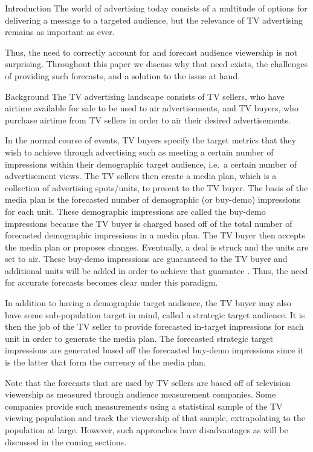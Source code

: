 \begin{chapter}{Introduction}\label{introduction}
  The world of advertising today consists of a multitude of options
  for delivering a message to a targeted audience, but the relevance of TV advertising
  remains as important as ever.

  Thus, the need to correctly account for and forecast audience viewership is not surprising.
  Throughout this paper we discuss why that need exists, the challenges of providing such forecasts,
  and a solution to the issue at hand.

\begin{section}{Background}
  The TV advertising landscape consists of TV sellers, who have airtime available
  for sale to be used to air advertisements, and TV buyers, who purchase airtime
  from TV sellers in order to air their desired advertisements.

  In the normal course of events, TV buyers specify the target metrics that
  they wish to achieve through advertising such as meeting a certain number of impressions within their demographic target audience,
  i.e.\ a certain number of advertisement views.
  The TV sellers then create a media plan, which is a collection of advertising spots/units, to present to the TV buyer.
  The basis of the media plan is the forecasted number of demographic (or buy-demo) impressions for each unit.
  These demographic impressions are called the buy-demo impressions because the TV buyer is charged
  based off of the total number of forecasted demographic impressions in a media plan.
  The TV buyer then accepts the media plan or proposes changes. Eventually,
  a deal is struck and the units are set to air. These buy-demo impressions are guaranteed to
  the TV buyer and additional units will be added in order to achieve that guarantee \cite{tvforecasting}. Thus, the need
  for accurate forecasts becomes clear under this paradigm.

  In addition to having a demographic target audience, the TV buyer may also have some sub-population
  target in mind, called a strategic target audience. It is then the job of the TV seller to
  provide forecasted in-target impressions for each unit in order to generate the media plan.
  The forecasted strategic target impressions are generated based off the
  forecasted buy-demo impressions since it is the latter
  that form the currency of the media plan.

  Note that the forecasts that are used by TV sellers are based off of
  television viewership as measured through audience measurement companies. Some companies
  provide such measurements
  using a statistical sample of the TV viewing population
  and track the viewership of that sample, extrapolating to the population at large.
  However, such approaches have disadvantages as will be discussed in the coming sections.
\end{section}


\end{chapter}

